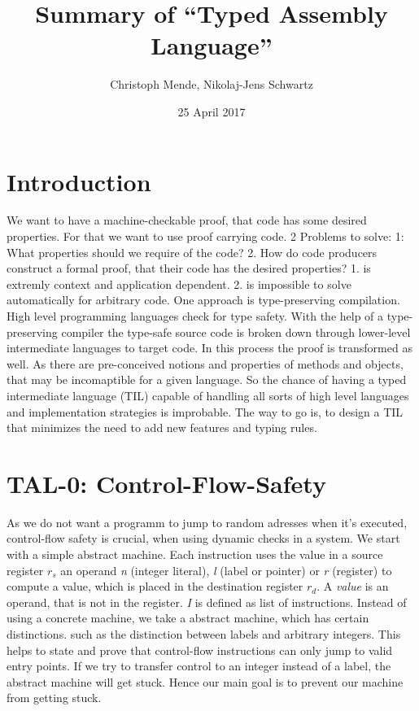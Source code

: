 \documentclass[acmlarge]{acmart}
\begin{document}

\title{Summary of ``Typed Assembly Language''\cite{Pierce:2004:ATT:1076265}}
\author{Christoph Mende, Nikolaj-Jens Schwartz}
\date{25 April 2017}
\maketitle

\section{Introduction}

We want to have a machine-checkable proof, that code has some desired properties. For that we want to use proof carrying code.
2 Problems to solve: 1: What properties should we require of the code? 2. How do code producers construct a formal proof, that their code has the desired properties?
1. is extremly context and application dependent. 2. is impossible to solve automatically for arbitrary code.
One approach is type-preserving compilation. High level programming languages check for type safety. With the help of a type-preserving compiler the type-safe source code is broken down through lower-level intermediate languages to target code. In this process the proof is transformed as well. As there are pre-conceived notions and properties of methods and objects, that may be incomaptible for a given language. So the chance of having a typed intermediate language (TIL) capable of handling all sorts of high level languages and implementation strategies is improbable. The way to go is, to design a TIL that minimizes the need to add new features and typing rules.

\section{TAL-0: Control-Flow-Safety}
As we do not want a programm to jump to random adresses when it's executed, control-flow safety is crucial, when using dynamic checks in a system.
We start with a simple abstract machine.
Each instruction uses the value in a source register $r_s$ an operand \emph{n} (integer literal), \emph{l} (label or pointer) or \emph{r} (register) to compute a value, which is placed in the destination register $r_d$.
A \emph{value} is an operand, that is not in the register. \emph{I} is defined as list of instructions.
Instead of using a concrete machine, we take a abstract machine, which has certain distinctions. such as the distinction between labels and arbitrary integers. This helps to state and prove that control-flow instructions can only jump to valid entry points.
If we try to transfer control to an integer instead of a label, the abstract machine will get stuck. Hence our main goal is to prevent our machine from getting stuck.
\end{document}
